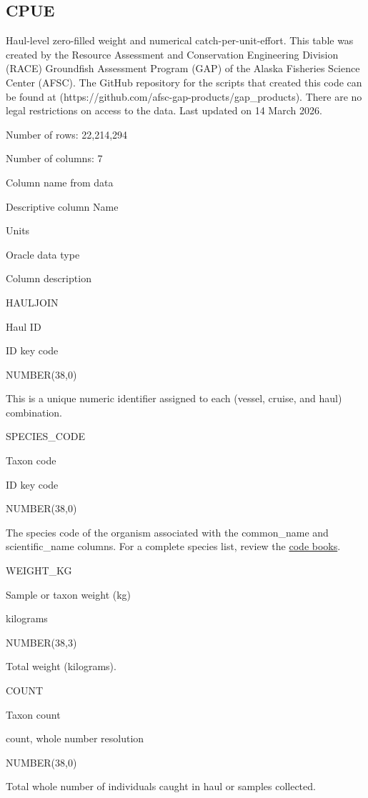 \documentclass[
  letterpaper,
  oneside,
  open=any]{scrbook}
\begin{document}
\subsection{CPUE}\label{cpue}

Haul-level zero-filled weight and numerical catch-per-unit-effort. This
table was created by the Resource Assessment and Conservation
Engineering Division (RACE) Groundfish Assessment Program (GAP) of the
Alaska Fisheries Science Center (AFSC). The GitHub repository for the
scripts that created this code can be found at
(https://github.com/afsc-gap-products/gap\_products). There are no legal
restrictions on access to the data. Last updated on 14 March 2026.

Number of rows: 22,214,294

Number of columns: 7

Column name from data

Descriptive column Name

Units

Oracle data type

Column description

HAULJOIN

Haul ID

ID key code

NUMBER(38,0)

This is a unique numeric identifier assigned to each (vessel, cruise,
and haul) combination.

SPECIES\_CODE

Taxon code

ID key code

NUMBER(38,0)

The species code of the organism associated with the common\_name and
scientific\_name columns. For a complete species list, review the
\href{https://www.fisheries.noaa.gov/resource/document/groundfish-survey-species-code-manual-and-data-codes-manual}{code
books}.

WEIGHT\_KG

Sample or taxon weight (kg)

kilograms

NUMBER(38,3)

Total weight (kilograms).

COUNT

Taxon count

count, whole number resolution

NUMBER(38,0)

Total whole number of individuals caught in haul or samples collected.
\end{document}
